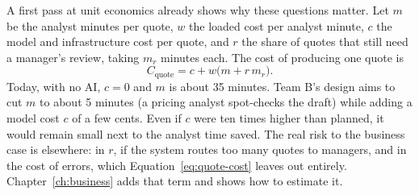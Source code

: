 A first pass at unit economics already shows why these questions matter. Let $m$ be the analyst minutes per quote, $w$ the loaded cost per analyst minute, $c$ the model and infrastructure cost per quote, and $r$ the share of quotes that still need a manager's review, taking $m_r$ minutes each. The cost of producing one quote is
\begin{equation}
  C_{\text{quote}} = c + w \bigl( m + r\, m_r \bigr).
  \label{eq:quote-cost}
\end{equation}
Today, with no AI, $c = 0$ and $m$ is about 35 minutes. Team B's design aims to cut $m$ to about 5 minutes (a pricing analyst spot-checks the draft) while adding a model cost $c$ of a few cents. Even if $c$ were ten times higher than planned, it would remain small next to the analyst time saved. The real risk to the business case is elsewhere: in $r$, if the system routes too many quotes to managers, and in the cost of errors, which Equation~\eqref{eq:quote-cost} leaves out entirely. Chapter~\ref{ch:business} adds that term and shows how to estimate it.
